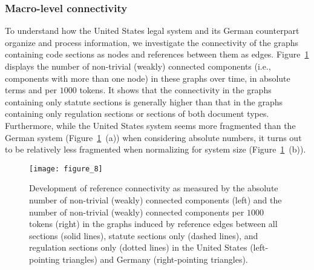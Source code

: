 \vspace*{6pt}
\subsubsection{Macro-level connectivity}
\label{subsubsec:results:connectivity:macro}

To understand how the United States legal system and its German counterpart organize and process information, we investigate the connectivity of the graphs containing code sections as nodes and references between them as edges. 
Figure~\ref{fig:connectivity-components} displays the number of non-trivial (weakly) connected components (i.e., components with more than one node) in these graphs over time, 
in absolute terms and per $1000$ tokens.
It shows that the connectivity in the graphs containing only statute sections is generally higher than that in the graphs containing only regulation sections or sections of both document types.
Furthermore, while the United States system seems more fragmented than the German system (Figure~\ref{fig:connectivity-components}~(a)) when considering absolute numbers, it turns out to be relatively less fragmented when normalizing for system size (Figure~\ref{fig:connectivity-components}~(b)).

\begin{figure}
	\centering
	\texttt{[image: figure\_8]}
	\caption{Development of reference connectivity as measured by the absolute number of non-trivial (weakly) connected components (left) and the number of non-trivial (weakly) connected components per $1000$ tokens (right) in the graphs induced by reference edges between all sections (solid lines), statute sections only (dashed lines), and regulation sections only (dotted lines) in the United States (left-pointing triangles) and Germany (right-pointing triangles).}\label{fig:connectivity-components}
\end{figure}


